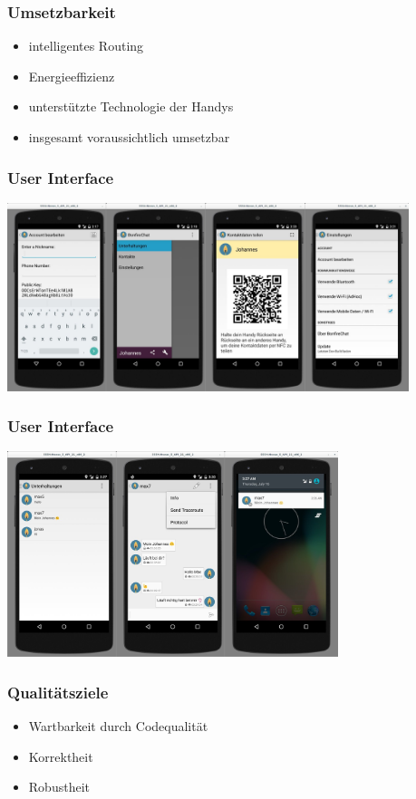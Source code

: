 \documentclass[accentcolor=tud4c,colorbacktitle]{tudbeamer}
\begin{document}
  \begin{frame}
    \frametitle{Umsetzbarkeit}
    \begin{itemize}
      \item intelligentes Routing
      \item Energieeffizienz
      \item unterstützte Technologie der Handys
    \end{itemize}
    \begin{itemize}
      \item insgesamt voraussichtlich umsetzbar
    \end{itemize}
  \end{frame}

  \begin{frame}
    \frametitle{User Interface}
    \begin{center}
      \includegraphics[height=5.5cm]{ui1.jpg}
    \end{center}
  \end{frame}

  \begin{frame}
    \frametitle{User Interface}
    \begin{center}
      \includegraphics[height=6cm]{ui2.jpg}
    \end{center}
  \end{frame}

  \begin{frame}
    \frametitle{Qualitätsziele}
    \begin{itemize}
      \item Wartbarkeit durch Codequalität
      \item Korrektheit
      \item Robustheit
    \end{itemize}
  \end{frame}
\end{document}
